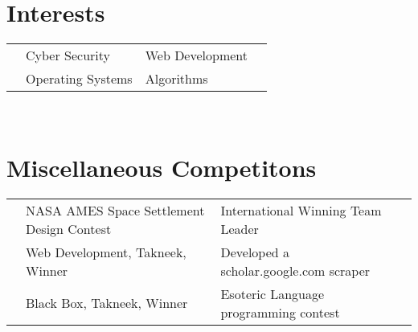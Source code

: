 \documentclass[11pt,a4paper]{article}
\begin{document}
\section*{Interests}
\begin{tabular}{L{0.05cm} L{7cm} L{6.5cm} L{7.5cm}}
& Cyber Security    & Web Development\\
& Operating Systems & Algorithms\\
\end{tabular}\\

\section*{Miscellaneous Competitons}
\begin{tabular}{L{0.05cm} L{8cm} L{8.5cm} L{8.5cm}}
&NASA AMES Space Settlement Design Contest & International Winning Team Leader\\
&Web Development, Takneek, Winner	  &Developed a scholar.google.com scraper\\
&Black Box, Takneek, Winner         &Esoteric Language programming contest\\
\end{tabular}\\

\
\end{document}
